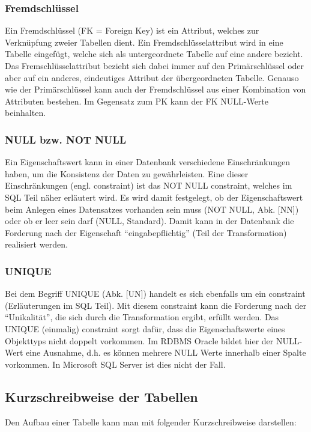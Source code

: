         \subsubsection{Fremdschl\"ussel}
          Ein Fremdschl\"ussel (FK = Foreign Key) ist ein Attribut, welches zur Verkn\"upfung zweier Tabellen dient. Ein Fremdschl\"usselattribut wird in eine Tabelle eingef\"ugt, welche sich als untergeordnete Tabelle auf eine andere bezieht. Das Fremschl\"usselattribut bezieht sich dabei immer auf den Prim\"arschl\"ussel oder aber auf ein anderes, eindeutiges Attribut der \"ubergeordneten Tabelle. Genauso wie der Prim\"arschl\"ussel kann auch der Fremdschl\"ussel aus einer Kombination von Attributen bestehen. Im Gegensatz zum PK kann der FK NULL-Werte beinhalten.
        \subsubsection{NULL bzw. NOT NULL}
          Ein Eigenschaftswert kann in einer Datenbank verschiedene Einschr\"ankungen haben, um die Konsistenz der Daten zu gew\"ahrleisten. Eine dieser Einschr\"ankungen (engl. constraint) ist das NOT NULL constraint, welches im SQL Teil n\"aher erl\"autert wird. Es wird damit festgelegt, ob der Eigenschaftswert beim Anlegen eines Datensatzes vorhanden sein muss (NOT NULL, Abk. [NN]) oder ob er leer sein darf (NULL, Standard). Damit kann in der Datenbank die Forderung nach der Eigenschaft \enquote{eingabepflichtig} (Teil der Transformation) realisiert werden.
        \subsubsection{UNIQUE}
          Bei dem Begriff UNIQUE (Abk. [UN]) handelt es sich ebenfalls um ein constraint (Er\-l\"au\-terung\-en im SQL Teil). Mit diesem constraint kann die Forderung nach der \enquote{Unikalit\"at}, die sich durch die Transformation ergibt, erf\"ullt werden. Das UNIQUE (einmalig) constraint sorgt daf\"ur, dass die Eigenschaftswerte eines Objekttyps nicht doppelt vorkommen. Im RDBMS Oracle bildet hier der NULL-Wert eine Ausnahme, d.h. es k\"onnen mehrere NULL Werte innerhalb einer Spalte vorkommen. In Microsoft SQL Server ist dies nicht der Fall.
      \subsection{Kurzschreibweise der Tabellen}
        Den Aufbau einer Tabelle kann man mit folgender Kurzschreibweise darstellen:

